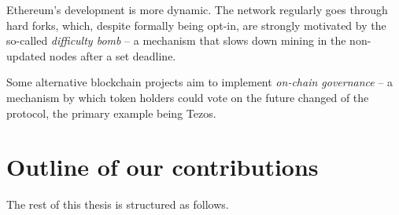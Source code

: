 Ethereum's development is more dynamic.
The network regularly goes through hard forks, which, despite formally being opt-in, are strongly motivated by the so-called \textit{difficulty bomb} -- a mechanism that slows down mining in the non-updated nodes after a set deadline.

Some alternative blockchain projects aim to implement \textit{on-chain governance} -- a mechanism by which token holders could vote on the future changed of the protocol, the primary example being Tezos.


\section{Outline of our contributions}

The rest of this thesis is structured as follows.

